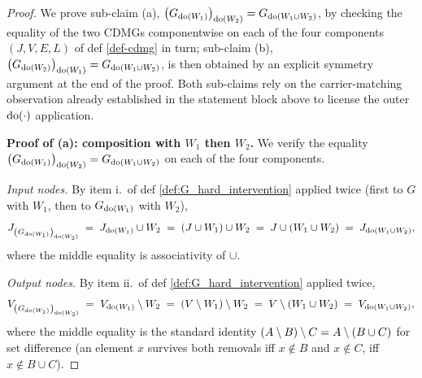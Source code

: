 \begin{proof}
We prove sub-claim (a), $\left ( G_{\operatorname{do}(W_1)} \right )_{\operatorname{do}(W_2)} = G_{\operatorname{do}(W_1 \cup W_2)}$, by checking the equality of the two CDMGs componentwise on each of the four components $(J, V, E, L)$ of def \ref{def-cdmg} in turn; sub-claim (b), $\left ( G_{\operatorname{do}(W_2)} \right )_{\operatorname{do}(W_1)} = G_{\operatorname{do}(W_1 \cup W_2)}$, is then obtained by an explicit symmetry argument at the end of the proof. Both sub-claims rely on the carrier-matching observation already established in the statement block above to license the outer $\operatorname{do}(\cdot)$ application.

\medskip\noindent\textbf{Proof of (a): composition with $W_1$ then $W_2$.}
We verify the equality $\left ( G_{\operatorname{do}(W_1)} \right )_{\operatorname{do}(W_2)} = G_{\operatorname{do}(W_1 \cup W_2)}$ on each of the four components.

\medskip\noindent\emph{Input nodes.}
By item i.\ of def \ref{def:G_hard_intervention} applied twice (first to $G$ with $W_1$, then to $G_{\operatorname{do}(W_1)}$ with $W_2$),
\[
    J_{\left ( G_{\operatorname{do}(W_1)} \right )_{\operatorname{do}(W_2)}} \;=\; J_{\operatorname{do}(W_1)} \cup W_2 \;=\; (J \cup W_1) \cup W_2 \;=\; J \cup (W_1 \cup W_2) \;=\; J_{\operatorname{do}(W_1 \cup W_2)},
\]
where the middle equality is associativity of $\cup$. \checkmark

\medskip\noindent\emph{Output nodes.}
By item ii.\ of def \ref{def:G_hard_intervention} applied twice,
\[
    V_{\left ( G_{\operatorname{do}(W_1)} \right )_{\operatorname{do}(W_2)}} \;=\; V_{\operatorname{do}(W_1)} \setminus W_2 \;=\; (V \setminus W_1) \setminus W_2 \;=\; V \setminus (W_1 \cup W_2) \;=\; V_{\operatorname{do}(W_1 \cup W_2)},
\]
where the middle equality is the standard identity $(A \setminus B) \setminus C = A \setminus (B \cup C)$ for set difference (an element $x$ survives both removals iff $x \notin B$ and $x \notin C$, iff $x \notin B \cup C$). \checkmark


\end{proof}
